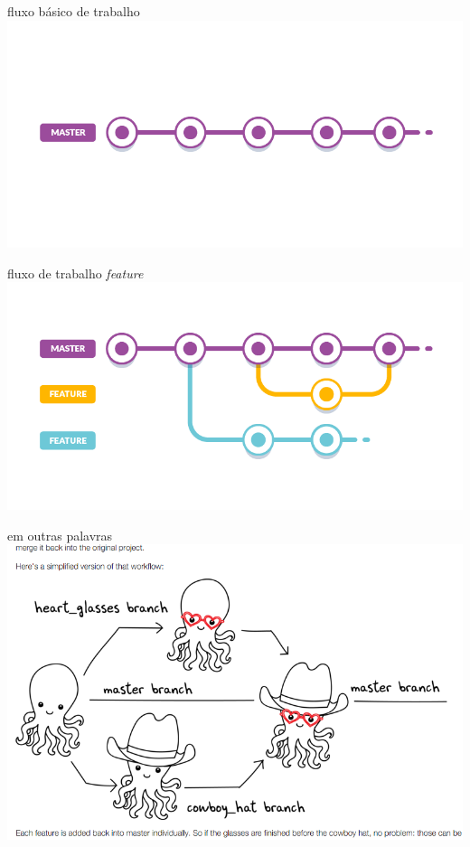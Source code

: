 \documentclass[11pt]{beamer}
\begin{document}
\begin{frame}{fluxo básico de trabalho}
\includegraphics[scale=.4]{basic.png}
\end{frame}

\begin{frame}{fluxo de trabalho \textit{feature}}
\includegraphics[scale=.4]{feature-branch.png}
\end{frame}


\begin{frame}{em outras palavras}
\includegraphics[scale=.4]{jennifer_gilbert.png}
\end{frame}
\end{document}
